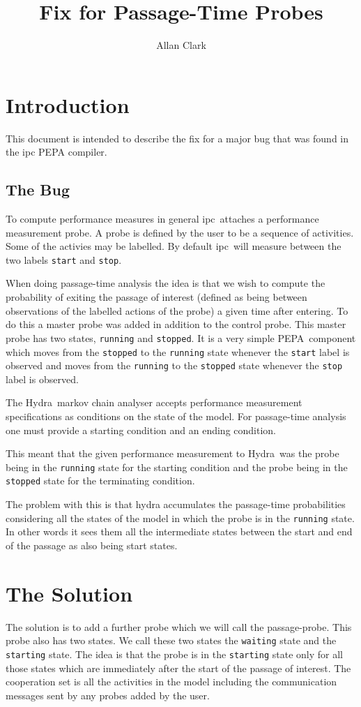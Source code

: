 \documentclass[10pt,a4paper]{article}
\title{Fix for Passage-Time Probes}
\author{
Allan Clark
}
\newcommand{\ipc}{\textsf{ipc}}
\newcommand{\hydra}{\textrm{Hydra}}
\newcommand{\pepa}{\textrm{PEPA}}
\begin{document}
\maketitle


\section{Introduction}
This document is intended to describe the fix for a major bug that was found in
the \ipc\cite{pepahydra} \pepa\cite{pepa} compiler.

\subsection{The Bug}
To compute performance measures in general \ipc\ attaches
a performance measurement probe.
A probe is defined by the user to be a sequence of activities.
Some of the activies may be labelled. By default \ipc\ will measure between
the two labels \texttt{start} and \texttt{stop}.

When doing passage-time analysis the idea is that we wish to compute the
probability of exiting the passage of interest (defined as being between
observations of the labelled actions of the probe) a given time after
entering. To do this a master probe was added in addition to the
control probe. This master probe has two states, \texttt{running} and
\texttt{stopped}.
It is a very simple \pepa\ component which moves from the \texttt{stopped}
to the \texttt{running} state whenever the \texttt{start} label is observed
and moves from the \texttt{running} to the \texttt{stopped} state whenever
the \texttt{stop} label is observed.

The \hydra\ markov chain analyser accepts performance measurement specifications
as conditions on the state of the model.
For passage-time analysis one must provide a starting condition
and an ending condition.

This meant that the given performance measurement to \hydra\ was the probe
being in the \texttt{running} state for the starting condition and the probe
being in the \texttt{stopped} state for the terminating condition.

The problem with this is that hydra accumulates the passage-time probabilities
considering all the states of the model in which the probe is in the
\texttt{running} state.
In other words it sees them all the intermediate states
between the start and end of the passage as also being start states.

\section{The Solution}
The solution is to add a further probe which we will call the passage-probe.
This probe also has two states. We call these two states the \texttt{waiting}
state and the \texttt{starting} state.
The idea is that the probe is in the \texttt{starting} state only for all those
states which are immediately after the start of the passage of interest.
The cooperation set is all the activities in the model including the communication
messages sent by any probes added by the user.
\end{document}
